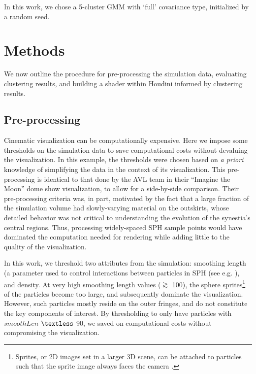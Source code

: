 \documentclass[fleqn,usenatbib,useAMS]{mnras}
\begin{document}
In this work, we chose a 5-cluster GMM with `full' covariance type, initialized by a random seed.


\section{Methods}\label{sec:Methods}

We now outline the procedure for pre-processing the simulation data, evaluating clustering results, and building a shader within Houdini informed by clustering results.

\subsection{Pre-processing}\label{subsec:Preprocessing}

Cinematic visualization can be computationally expensive. Here we impose some thresholds on the simulation data to save computational costs without devaluing the visualization. In this example, the thresholds were chosen based on \textit{a priori} knowledge of simplifying the data in the context of its visualization. This pre-processing is identical to that done by the AVL team in their ``Imagine the Moon'' dome show visualization, to allow for a side-by-side comparison. Their pre-processing criteria was, in part, motivated by the fact that a large fraction of the simulation volume had slowly-varying material on the outskirts, whose detailed behavior was not critical to understanding the evolution of the synestia's central regions. Thus, processing widely-spaced SPH sample points would have dominated the computation needed for rendering while adding little to the quality of the visualization. \par

In this work, we threshold two attributes from the simulation: smoothing length (a parameter used to control interactions between particles in SPH (see e.g. \cite{Springel01}), and density. At very high smoothing length values ($\gtrsim$ 100), the sphere sprites\footnote{Sprites, or 2D images set in a larger 3D scene, can be attached to particles such that the sprite image always faces the camera \citep{ORourke98}.} of the particles become too large, and subsequently dominate the visualization. However, such particles mostly reside on the outer fringes, and do not constitute the key components of interest. By thresholding to only have particles with $smoothLen$ $\textless$ 90, we saved on computational costs without compromising the visualization. \par
\end{document}

